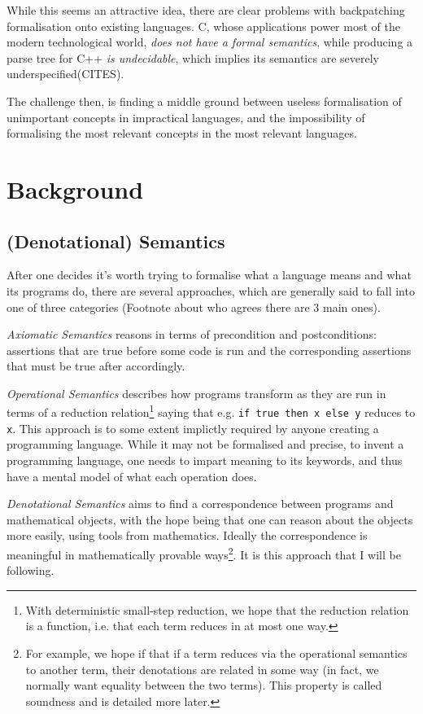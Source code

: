 \documentclass[12pt,a4paper,twoside,openright]{report}
\begin{document}
While this seems an attractive idea, there are clear problems with backpatching formalisation onto existing languages. C, whose applications power most of the modern technological world, \textit{does not have a formal semantics}, while producing a parse tree for C++ \textit{is undecidable}, which implies its semantics are severely underspecified(CITES). 

The challenge then, is finding a middle ground between useless formalisation of unimportant concepts in impractical languages, and the impossibility of formalising the most relevant concepts in the most relevant languages. 

\section{Background}
\subsection{(Denotational) Semantics}
After one decides it's worth trying to formalise what a language means and what its programs do, there are several approaches, which are generally said to fall into one of three categories (Footnote about who agrees there are 3 main ones).

\textit{Axiomatic Semantics} reasons in terms of precondition and postconditions: assertions that are true before some code is run and the corresponding assertions that must be true after accordingly.

\textit{Operational Semantics} describes how programs transform as they are run in terms of a reduction relation\footnote{With deterministic small-step reduction, we hope that the reduction relation is a function, i.e. that each term reduces in at most one way.} saying that e.g. \texttt{if true then x else y} reduces to \texttt{x}. This approach is to some extent implictly required by anyone creating a programming language. While it may not be formalised and precise, to invent a programming language, one needs to impart meaning to its keywords, and thus have a mental model of what each operation does. 

\textit{Denotational Semantics} aims to find a correspondence between programs and mathematical objects, with the hope being that one can reason about the objects more easily, using tools from mathematics. Ideally the correspondence is meaningful in mathematically provable ways\footnote{For example, we hope if that if a term reduces via the operational semantics to another term, their denotations are related in some way (in fact, we normally want equality between the two terms). This property is called soundness and is detailed more later.}. It is this approach that I will be following. 
\end{document}
